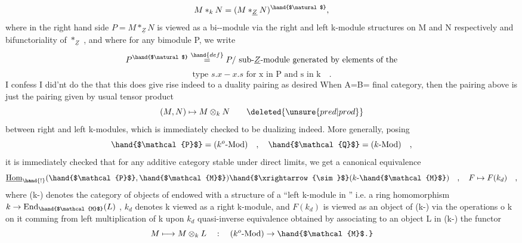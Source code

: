 \[M *_{k} N = (M *_{\underline{Z}} N)^{\hand{$\natural$}} ,\]
where in the right hand side $P = M *_{\underline{Z}} N$ is viewed as a bi--module
via the right and left k-module structures on M and N respectively and
bifunctoriality of $*_{\underline{Z}}$ , and where for any  bimodule P, we write
\[P^{\hand{$\natural$}} \overset{\hand{def}}{=} P/ \text{ sub-$\underline{Z}$-module generated by elements of the}\]
\[\text{type } s.x - x.s \text{ for x in P and s in k} \quad .\]
\deleted{(}I confess I did'nt do the  that this does give rise indeed to a
duality pairing as desired\deleted{)} When A=B= final category, then the 
pairing above is just the pairing given by usual tensor product
\[(M,N)\mapsto M\otimes_{k}N \qquad \deleted{\unsure{pred|prod}}\]
between right and left k-modules, which is immediately checked to be
dualizing indeed. More generally, posing
\[\hand{$\mathcal{P}$}= (k^{o}\text{-Mod}) \quad , \quad \hand{$\mathcal{Q}$}= (k\text{-Mod}) \quad ,\]
it is immediately checked that for any additive category  stable under
 direct limits, we get a canonical equivalence
\[\underline{\text{Hom}}_{\hand{!}}(\hand{$\mathcal{P}$},\hand{$\mathcal{M}$}) \hand{$\xrightarrow{\sim}$} (k\text{-}\hand{$\mathcal{M}$}) \quad , \quad F \mapsto F(k_{d}) \quad ,\]
where (k-) denotes the category of objects  of  endowed with a
structure  of a ``left k-module in '' i.e. a ring homomorphism
$k\to \text{End}_{\hand{$\mathcal{M}$}}(L)$ , $k_{d}$ denotes k viewed as a right k-module, and $F(k_{d})$ is 
viewed as an object of (k-) via the operations o k on it comming from
left multiplication of k upon $k_{d}$   quasi-inverse equivalence  
obtained by associating to an object L in (k-) the functor
\[M \longmapsto M\otimes_{k}L \quad : \quad (k^{o}\text{-Mod})\to \hand{$\mathcal{M}$.}\]
